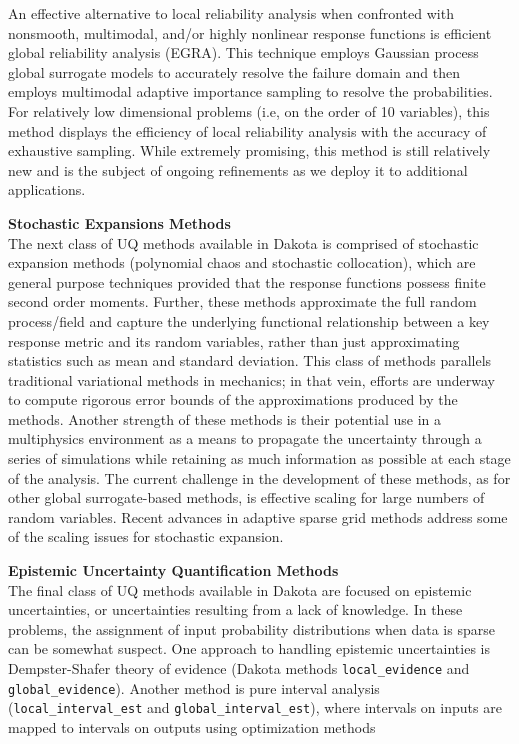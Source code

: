 An effective alternative to local reliability analysis when confronted
with nonsmooth, multimodal, and/or highly nonlinear response functions
is efficient global reliability analysis (EGRA). This technique
employs Gaussian process global surrogate models to accurately resolve
the failure domain and then employs multimodal adaptive importance
sampling to resolve the probabilities. For relatively low dimensional
problems (i.e, on the order of 10 variables), this method displays the
efficiency of local reliability analysis with the accuracy of
exhaustive sampling. While extremely promising, this method is still
relatively new and is the subject of ongoing refinements as we deploy
it to additional applications.

{\bf Stochastic Expansions Methods} \\
The next class of UQ methods available in Dakota is comprised of
stochastic expansion methods (polynomial chaos and stochastic
collocation), which are general purpose techniques provided that the
response functions possess finite second order moments. Further, these
methods approximate the full random process/field and capture the
underlying functional relationship between a key response metric and
its random variables, rather than just approximating statistics such
as mean and standard deviation. This class of methods parallels
traditional variational methods in mechanics; in that vein, efforts
are underway to compute rigorous error bounds of the approximations
produced by the methods. Another strength of these methods is their
potential use in a multiphysics environment as a means to propagate
the uncertainty through a series of simulations while retaining as
much information as possible at each stage of the analysis. The
current challenge in the development of these methods, as for other
global surrogate-based methods, is effective scaling for large numbers
of random variables. Recent advances in adaptive sparse grid methods 
address some of the scaling issues for stochastic expansion.

{\bf Epistemic Uncertainty Quantification Methods} \\
The final class of UQ methods available in Dakota are focused on
epistemic uncertainties, or uncertainties resulting from a lack of
knowledge. In these problems, the assignment of input probability
distributions when data is sparse can be somewhat suspect. One
approach to handling epistemic uncertainties is Dempster-Shafer theory
of evidence (Dakota methods \texttt{local\_evidence} and 
\texttt{global\_evidence}). Another method is pure interval 
analysis (\texttt{local\_interval\_est} and 
\texttt{global\_interval\_est}), where intervals on inputs are 
mapped to intervals on outputs using optimization methods 

